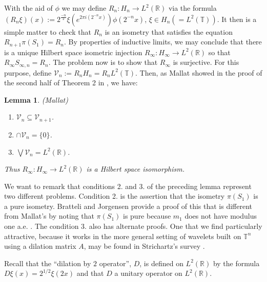 \documentclass{amsproc}
\theoremstyle{plain}
\theoremstyle{definition}
\theoremstyle{definition}
\theoremstyle{remark}
\theoremstyle{plain}
\newtheorem{lem}[thm]{Lemma}
\begin{document}
With the aid of $\phi$ we may define $R_{n}:H_{n}\rightarrow L^{2}(\mathbb{R})$
via the formula $(R_{n}\xi)(x):=2^{\frac{-n}{2}}\xi(e^{2\pi
i(2^{-n}x)})\phi(2^{-n}x)$,
$\xi\in H_{n}(=L^{2}(\mathbb{T}))$. It then is a simple matter to
check that $R_{n}$ is an isometry that satisfies the equation
$R_{n+1}\pi(S_{1})=R_{n}$.
By properties of inductive limits, we may conclude that there is a
unique Hilbert space isometric injection $R_{\infty}:H_{\infty}\rightarrow
L^{2}(\mathbb{R})$
so that $R_{\infty}S_{\infty,n}=R_{n}$. The problem now is to show
that $R_{\infty}$ is surjective. For this purpose, define
$\mathcal{V}_{n}:=R_{n}H_{n}=R_{n}L^{2}(\mathbb{T}).$
Then, as Mallat showed in the proof of the second half of Theorem
2 in \cite{sM89}, we have:

\begin{lem}
\label{Mallat}(Mallat) 
\begin{enumerate}
\item $\mathcal{V}_{n}\subseteq\mathcal{V}_{n+1}$. 
\item $\cap{\mathcal{V}_{n}}=\{0\}$. 
\item $\bigvee\mathcal{V}_{n}=L^{2}(\mathbb{R})$. 
\end{enumerate}
Thus $R_{\infty}:H_{\infty}\rightarrow L^{2}(\mathbb{R})$ is a Hilbert
space isomorphism. 
\end{lem}
We want to remark that conditions 2. and 3. of the preceding lemma
represent two different problems. Condition 2. is the assertion that
the isometry $\pi(S_{1})$ is a pure isometry. Bratteli and Jorgensen
provide a proof of this that is different from Mallat's by noting
that $\pi(S_{1})$ is pure because $m_{1}$ does not have modulus
one a.e. \cite[Theorem 3.1]{BJ97}. The condition 3. also has alternate
proofs. One that we find particularly attractive, because it works
in the more general setting of wavelets built on $\mathbb{T}^{n}$
using a dilation matrix $A$, may be found in Strichartz's survey
\cite[Lemma 3.1]{rS94}.

Recall that the ``dilation by $2$ operator'', $D$, is defined on
$L^{2}(\mathbb{R})$ by the formula $D\xi(x)=2^{1/2}\xi(2x)$ and
that $D$ a unitary operator on $L^{2}(\mathbb{R})$.
\end{document}
